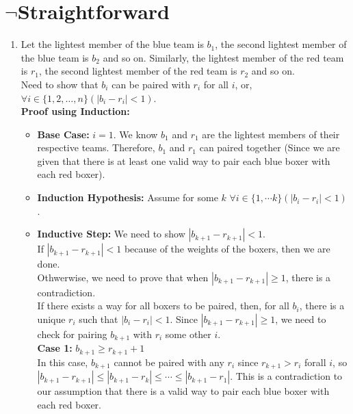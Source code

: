 \documentclass[a4paper]{article}
\begin{document}
\section{$\neg$Straightforward}
    \begin{enumerate}
        \item Let the lightest member of the blue team is $b_1$, the second lightest member of the blue team is $b_2$ and so on. Similarly, the lightest member of the red team is $r_1$, the second lightest member of the red team is $r_2$ and so on.\\
        
        Need to show that $b_i$ can be paired with $r_i$ for all $i$, or, $\forall i \in \{1, 2, \dots, n\} (|b_i - r_i| < 1)$. \\

        \textbf{Proof using Induction:}
        \begin{itemize}
            \item \textbf{Base Case:} $i = 1$. We know $b_1$ and $r_1$ are the lightest members of their respective teams. Therefore, $b_1$ and $r_1$ can paired together (Since we are given that there is at least one valid way to pair each blue boxer with each red boxer).
            \item \textbf{Induction Hypothesis:} Assume for some $k$ $\forall i \in \{1, \cdots k\} (|b_i - r_i| < 1)$. 
            \item \textbf{Inductive Step:} We need to show $|b_{k+1} - r_{k+1}| < 1$.\\
            
            If $|b_{k+1} - r_{k+1}| < 1$ because of the weights of the boxers, then we are done. \\

            Othwerwise, we need to prove that when $|b_{k+1} - r_{k+1}| \ge 1$, there is a contradiction. \\
            If there exists a way for all boxers to be paired, then, for all $b_i$, there is a unique $r_i$ such that $|b_i - r_i| < 1$. Since $|b_{k+1} - r_{k+1}| \ge 1$, we need to check for pairing $b_{k+1}$ with $r_i$ some other $i$. \\

            \textbf{Case 1:} $b_{k+1} \ge r_{k+1} + 1$ \\
            In this case, $b_{k+1}$ cannot be paired with any $r_i$ since $r_{k+1} > r_i$ forall $i$, so $|b_{k+1} - r_{k+1}| \le |b_{k+1} - r_{k}| \le \cdots \le |b_{k+1} - r_{1}|$. This is a contradiction to our assumption that there is a valid way to pair each blue boxer with each red boxer. \\


\end{itemize}
\end{enumerate}
\end{document}
